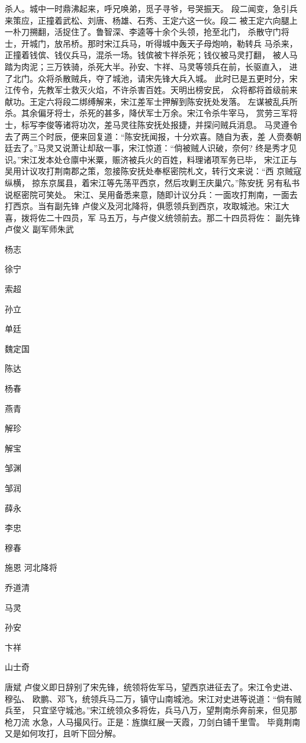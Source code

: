 杀人。城中一时鼎沸起来，呼兄唤弟，觅子寻爷，号哭振天。
段二闻变，急引兵来策应，正撞着武松、刘唐、杨雄、石秀、王定六这一伙。段二
被王定六向腿上一朴刀搠翻，活捉住了。鲁智深、李逵等十余个头领，抢至北门，
杀散守门将士，开城门，放吊桥。那时宋江兵马，听得城中轰天子母炮响，勒转兵
马杀来，正撞着钱傧、钱仪兵马，混杀一场。钱傧被卞祥杀死；钱仪被马灵打翻，
被人马踏为肉泥；三万铁骑，杀死大半。孙安、卞祥、马灵等领兵在前，长驱直入，
进了北门。众将杀散贼兵，夺了城池，请宋先锋大兵入城。
此时已是五更时分，宋江传令，先教军士救灭火焰，不许杀害百姓。天明出榜安民，
众将都将首级前来献功。王定六将段二绑缚解来，宋江差军士押解到陈安抚处发落。
左谋被乱兵所杀。其余偏牙将士，杀死的甚多，降伏军士万余。宋江令杀牛宰马，
赏劳三军将士，标写李俊等诸将功次，差马灵往陈安抚处报捷，并探问贼兵消息。
马灵遵令去了两三个时辰，便来回复道：“陈安抚闻报，十分欢喜。随自为表，差
人赍奏朝廷去了。”马灵又说萧让却敌一事，宋江惊道：“倘被贼人识破，奈何?
终是秀才见识。”宋江发本处仓廪中米粟，赈济被兵火的百姓，料理诸项军务已毕，
宋江正与吴用计议攻打荆南郡之策，忽接陈安抚处奉枢密院札文，转行文来说：“西
京贼寇纵横，掠东京属县，着宋江等先荡平西京，然后攻剿王庆巢穴。”陈安抚
另有私书说枢密院可笑处。
宋江、吴用备悉来意，随即计议分兵：一面攻打荆南，一面去打西京。当有副先锋
卢俊义及河北降将，俱愿领兵到西京，攻取城池。宋江大喜，拨将佐二十四员，军
马五万，与卢俊义统领前去。那二十四员将佐：
副先锋卢俊义
副军师朱武

杨志

徐宁

索超

孙立

单廷

魏定国

陈达

杨春

燕青

解珍

解宝

邹渊

邹润

薛永

李忠

穆春

施恩
河北降将

乔道清

马灵

孙安

卞祥

山士奇

唐斌
卢俊义即日辞别了宋先锋，统领将佐军马，望西京进征去了。宋江令史进、穆弘、
欧鹏、邓飞，统领兵马二万，镇守山南城池。宋江对史进等说道：“倘有贼兵至，
只宜坚守城池。”宋江统领众多将佐，兵马八万，望荆南杀奔前来，但见那枪刀流
水急，人马撮风行。正是：旌旗红展一天霞，刀剑白铺千里雪。
毕竟荆南又是如何攻打，且听下回分解。